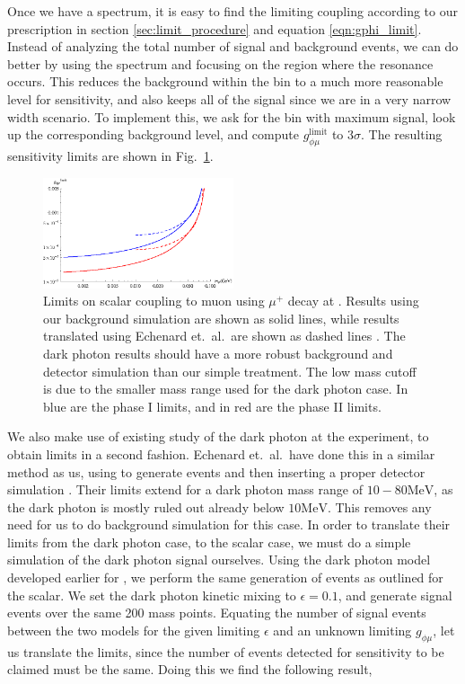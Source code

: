 Once we have a spectrum, it is easy to find the limiting coupling according to our prescription in section \ref{sec:limit_procedure} and equation \ref{eqn:gphi_limit}.
Instead of analyzing the total number of signal and background events, we can do better by using the spectrum and focusing on the region where the resonance occurs.
This reduces the background within the bin to a much more reasonable level for sensitivity, and also keeps all of the signal since we are in a very narrow width scenario.
To implement this, we ask for the bin with maximum signal, look up the corresponding background level, and compute $g_{\phi\mu}^\textrm{limit}$ to $3\sigma$.
The resulting sensitivity limits are shown in Fig.\ \ref{fig:mu3e_limits}.

\begin{figure}[h]
    \centering
    \includegraphics[width=0.5\textwidth]{Figures/limits/mu3e_all}
    \caption{Limits on scalar coupling to muon using $\mu^+$ decay at \mueee. Results using our background simulation are shown as solid lines, while results translated using Echenard et.\ al.\ are shown as dashed lines \cite{Echenard:2014lma}. The dark photon results should have a more robust background and detector simulation than our simple treatment. The low mass cutoff is due to the smaller mass range used for the dark photon case. In blue are the phase I limits, and in red are the phase II limits.}
    \label{fig:mu3e_limits}
\end{figure}

We also make use of existing study of the dark photon at the \mueee experiment, to obtain limits in a second fashion.
Echenard et.\ al.\ have done this in a similar method as us, using \madgraph to generate events and then inserting a proper detector simulation \cite{Echenard:2014lma}.
Their limits extend for a dark photon mass range of $10 - 80\textrm{MeV}$, as the dark photon is mostly ruled out already below $10\textrm{MeV}$.
This removes any need for us to do background simulation for this case.
In order to translate their limits from the dark photon case, to the scalar case, we must do a simple simulation of the dark photon signal ourselves.
Using the dark photon model developed earlier for \madgraph, we perform the same generation of events as outlined for the scalar.
We set the dark photon kinetic mixing to $\epsilon = 0.1$, and generate signal events over the same 200 mass points.
Equating the number of signal events between the two models for the given limiting $\epsilon$ and an unknown limiting $g_{\phi\mu}$, let us translate the limits, since the number of events detected for sensitivity to be claimed must be the same.
Doing this we find the following result,

